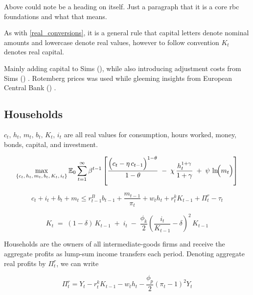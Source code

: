\documentclass[11pt,preprint]{elsarticle}
\numberwithin{equation}{section}
\numberwithin{figure}{section}
\numberwithin{table}{section}
\begin{document}
Above could note be a heading on itself. Just a paragraph that it is a
core rbc foundations and what that means.

As with \eqref{real_conversions}, it is a general rule that capital
letters denote nominal amounts and lowercase denote real values, however
to follow convention \(K_t\) denotes real capital.

Mainly adding capital to Sims
(), while also introducing
adjustment costs from Sims () .
Rotemberg prices was used while gleeming insights from European Central
Bank () .

\subsection{Households}\label{households}

\(c_t,\,h_t,\,m_t,\,b_t,\,K_t,\,i_t\) are all real values for
consumption, hours worked, money, bonds, capital, and investment.

\begin{equation}
\max_{\{c_t,\,h_t,\,m_t,\,b_t,\,K_t,\,i_t\}}
\mathbb{E}_0 \sum_{t=1}^{\infty} \beta^{t-1}
\left[
\frac{\Bigl(c_t - \eta\,c_{t-1}\Bigr)^{1-\theta}}{1-\theta}
\;-\;\chi\,\frac{h_t^{1+\gamma}}{1+\gamma}
\;+\;\psi\,\ln\!\Bigl(m_t\Bigr)
\right]
\label{lifetime_utility_real}
\end{equation}

\begin{equation}
c_t + i_t + b_t + m_t \leq r^B_{t-1}b_{t-1} + \dfrac{m_{t-1}}{\pi_t} + w_t h_t + r^k_t K_{t-1} + \Pi^r_t - \tau_t
\label{flow_constraint_real}
\end{equation}

\begin{equation}
K_t
\;=\;
(1 - \delta)\,K_{t-1}
\;+\; i_t
\;-\;\frac{\phi_k}{2}
\left(\frac{i_t}{K_{t-1}} - \delta\right)^{2}
\,K_{t-1}
\label{capital_accumulation_real}
\end{equation}

Households are the owners of all intermediate‐goods firms and receive
the aggregate profits as lump‐sum income transfers each period. Denoting
aggregate real profits by \(\Pi^r_t\), we can write

\begin{equation}
\Pi^r_t = Y_t - r^k_t K_{t-1} - w_t h_t - \dfrac{\phi_p}{2} (\pi_t - 1)^2 Y_t
\label{intermediate_firm_profit_real}
\end{equation}
\end{document}
